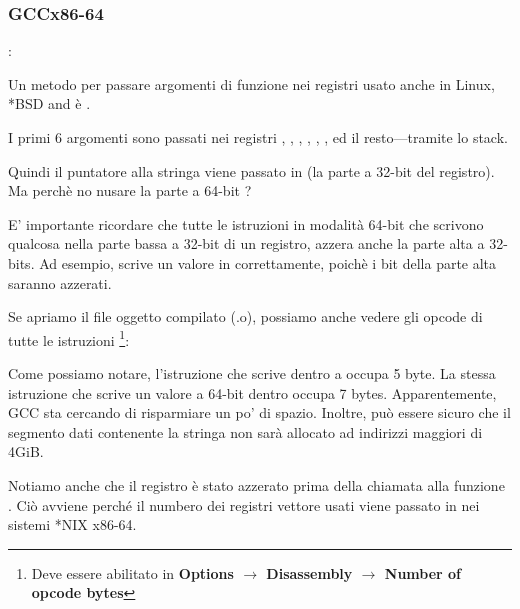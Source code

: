 \subsubsection{GCC\EMDASH{}x86-64}

\ITAph{}:



Un metodo per passare argomenti di funzione nei registri usato anche in Linux, *BSD and \MacOSX è \SysVABI.

I primi 6 argomenti sono passati nei registri \RDI, \RSI, \RDX, \RCX, ,   , ed il resto---tramite lo stack.

Quindi il puntatore alla stringa viene passato in \EDI (la parte a 32-bit del registro).
Ma perchè no nusare la parte a 64-bit \RDI?

E' importante ricordare che tutte le istruzioni \MOV in modalità 64-bit che scrivono qualcosa nella parte bassa a 32-bit di un registro, azzera anche la parte alta a 32-bits.
Ad esempio,  scrive un valore in \RAX correttamente, poichè i bit della parte alta saranno azzerati.

Se apriamo il file oggetto compilato (.o), possiamo anche vedere gli opcode di tutte le istruzioni
\footnote{Deve essere abilitato in \textbf{Options $\rightarrow$ Disassembly $\rightarrow$ Number of opcode bytes}}:



\label{hw_EDI_instead_of_RDI}
Come possiamo notare, l'istruzione che scrive dentro \EDI a  occupa 5 byte.
La stessa istruzione che scrive un valore a 64-bit dentro \RDI occupa 7 bytes.
Apparentemente, GCC sta cercando di risparmiare un po' di spazio.
Inoltre, può essere sicuro che il segmento dati contenente la stringa non sarà allocato ad indirizzi maggiori di 4\gls{GiB}.

\label{SysVABI_input_EAX}
Notiamo anche che il registro \EAX è stato azzerato prima della chiamata alla funzione \printf .
Ciò avviene perché il numbero dei registri vettore usati viene passato in \EAX nei sistemi *NIX x86-64.

